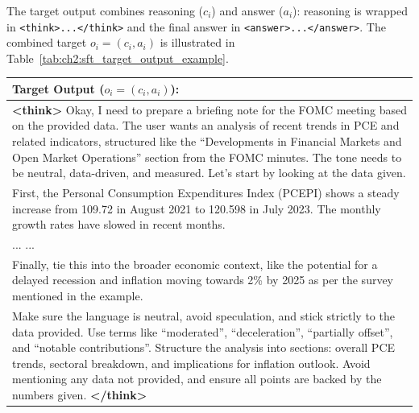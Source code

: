 The target output combines reasoning ($c_i$) and answer ($a_i$): reasoning is wrapped in \texttt{<think>...</think>} and the final answer in \texttt{<answer>...</answer>}. The combined target $o_i=(c_i,a_i)$ is illustrated in Table~\ref{tab:ch2:sft_target_output_example}.


\begin{table}[h]
    \centering
    \footnotesize
    \begin{tabular}{p{}}
    \toprule
    \textbf{Target Output ($o_i = (c_i, a_i)$):} \\
    \midrule
    \textbf{\textless think\textgreater} Okay, I need to prepare a briefing note for the FOMC meeting based on the provided data. The user wants an analysis of recent trends in PCE and related indicators, structured like the \textquotedblleft Developments in Financial Markets and Open Market Operations\textquotedblright{} section from the FOMC minutes. The tone needs to be neutral, data-driven, and measured. Let's start by looking at the data given. \\

    First, the Personal Consumption Expenditures Index (PCEPI) shows a steady increase from 109.72 in August 2021 to 120.598 in July 2023. The monthly growth rates have slowed in recent months. \\

    ... ... \\

    Finally, tie this into the broader economic context, like the potential for a delayed recession and inflation moving towards 2\% by 2025 as per the survey mentioned in the example. \\

    Make sure the language is neutral, avoid speculation, and stick strictly to the data provided. Use terms like ``moderated'', ``deceleration'', ``partially offset'', and ``notable contributions''. Structure the analysis into sections: overall PCE trends, sectoral breakdown, and implications for inflation outlook. Avoid mentioning any data not provided, and ensure all points are backed by the numbers given. \textbf{\textless /think\textgreater} \\[1ex]


\end{tabular}
\end{table}
